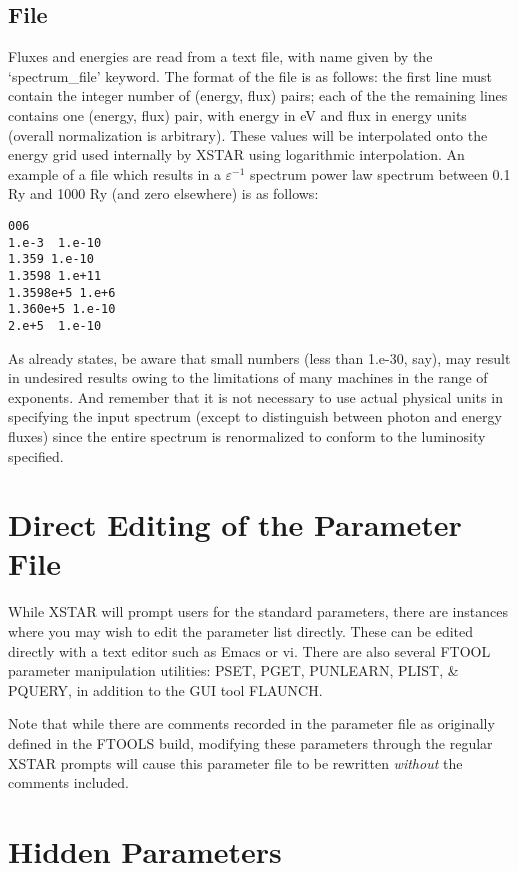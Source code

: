 \subsection{File}

Fluxes and energies are read from a text file, with name given by the 
`spectrum\_file' keyword.  The format of the file is as follows:
the first line must contain the integer number of (energy, flux) pairs;
each of the the remaining lines contains one (energy, flux) pair, 
with energy  in eV and flux in energy units (overall normalization is arbitrary).
These values will be interpolated onto the energy grid used internally by 
XSTAR using logarithmic interpolation.  An example of a file which results 
in a $\varepsilon^{-1}$ spectrum power law spectrum between 0.1 Ry and 1000 Ry
(and zero elsewhere) is as follows:

\begin{verbatim}
006
1.e-3  1.e-10
1.359 1.e-10
1.3598 1.e+11
1.3598e+5 1.e+6
1.360e+5 1.e-10
2.e+5  1.e-10
\end{verbatim}

As already states, be aware 
that small numbers (less than 1.e-30, say), may result 
in undesired results owing to the limitations of many machines 
in the range of exponents.  And remember that it is not 
necessary to use actual physical units in specifying the input spectrum
(except to distinguish between photon and energy fluxes)
since the entire spectrum is renormalized to conform to the 
luminosity specified.


\section{Direct Editing of the Parameter File}

While XSTAR will prompt users for the standard parameters, there are 
instances where you may wish to edit the parameter list directly.  
These can be edited directly with a text editor such as Emacs or vi.  
There are also several FTOOL parameter manipulation utilities: PSET, 
PGET, PUNLEARN, PLIST, \& PQUERY, in addition to the GUI tool FLAUNCH.

Note that while there are comments recorded in the parameter file as 
originally defined in the FTOOLS build, modifying these parameters 
through the regular XSTAR prompts will cause this parameter file to 
be rewritten {\it without} the comments included.

\section{Hidden Parameters}

